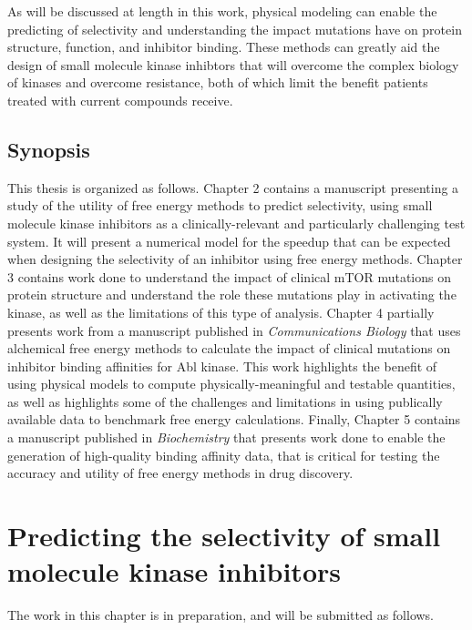 \documentclass[phd,tocprelim]{cornell}
\begin{document}
As will be discussed at length in this work, physical modeling can enable the predicting of selectivity and understanding the impact mutations have on protein structure, function, and inhibitor binding. These methods can greatly aid the design of small molecule kinase inhibtors that will overcome the complex biology of kinases and overcome resistance, both of which limit the benefit patients treated with current compounds receive. 

 \section{Synopsis}
 This thesis is organized as follows. Chapter 2 contains a manuscript presenting a study of the utility of free energy methods to predict selectivity, using small molecule kinase inhibitors as a clinically-relevant and particularly challenging test system. It will present a numerical model for the speedup that can be expected when designing the selectivity of an inhibitor using free energy methods. Chapter 3 contains work done to understand the impact of clinical mTOR mutations on protein structure and understand the role these mutations play in activating the kinase, as well as the limitations of this type of analysis. Chapter 4 partially presents work from a manuscript published in \emph{Communications Biology} that uses alchemical free energy methods to calculate the impact of clinical mutations on inhibitor binding affinities for Abl kinase. This work highlights the benefit of using physical models to compute physically-meaningful and testable quantities, as well as highlights some of the challenges and limitations in using publically available data to benchmark free energy calculations. Finally, Chapter 5 contains a manuscript published in \emph{Biochemistry} that presents work done to enable the generation of high-quality binding affinity data, that is critical for testing the accuracy and utility of free energy methods in drug discovery. 
 
 
 
\chapter{Predicting the selectivity of small molecule kinase inhibitors}

The work in this chapter is in preparation, and will be submitted as follows. 
\realsinglespacing
{}
\end{document}
